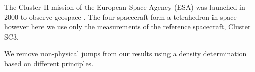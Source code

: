 \documentclass[b5paper,10pt]{article}
\begin{document}
The Cluster-II mission of the European Space Agency (ESA) was launched in 2000 to observe geospace \citep{credland97:_clust_mission,escoubet01:_introd_clust}. The four spacecraft form a tetrahedron in space however here we use only the measurements of the reference spacecraft, Cluster SC3. %

We remove non-physical jumps from our results using a density determination based on different principles. %
\end{document}
